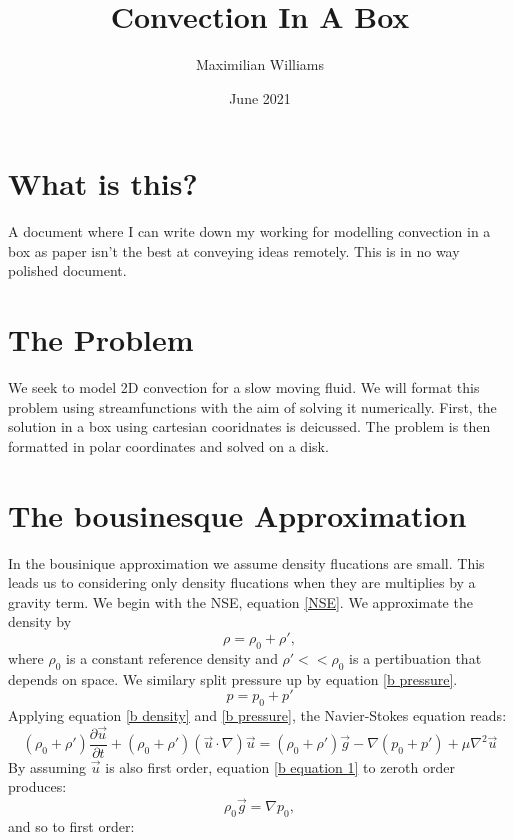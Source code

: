 \documentclass{article}
\title{Convection In A Box}
\author{Maximilian Williams}
\date{June 2021}
\begin{document}
\maketitle

\section*{What is this?}
A document where I can write down my working for modelling convection in a box as paper isn't the best at conveying ideas remotely. This is in no way polished document.

\section*{The Problem}
We seek to model 2D convection for a slow moving fluid. We will format this problem using streamfunctions with the aim of solving it numerically. First, the solution in a box using cartesian cooridnates is deicussed. The problem is then formatted in polar coordinates and solved on a disk.
\section*{The bousinesque Approximation}
In the bousinique approximation we assume density flucations are small. This leads us to considering only density flucations when they are multiplies by a gravity term.
\newline
We begin with the NSE, equation \ref{NSE}. We approximate the density by
\begin{equation}
	\rho = \rho_0 + \rho',
	\label{b density}
\end{equation}
where $\rho_0$ is a constant reference density and $\rho' << \rho_0$ is a pertibuation that depends on space. We similary split pressure up by equation \ref{b pressure}. 
\begin{equation}
	p = p_0 + p'
	\label{b pressure}
\end{equation}
Applying equation \ref{b density} and \ref{b pressure}, the Navier-Stokes equation reads:
\begin{equation}
	(\rho_0 + \rho') \frac{\partial \vec{u}}{\partial t} + (\rho_0 + \rho') (\vec{u} \cdot \nabla) \vec{u} = (\rho_0 + \rho') \vec{g} - \nabla (p_0 + p') + \mu \nabla^2 \vec{u}
	\label{b equation 1}
\end{equation}
By assuming $\vec{u}$ is also first order, equation \ref{b equation 1} to zeroth order produces:
\begin{equation}
	\rho_0 \vec{g} = \nabla p_0,
\end{equation}
and so to first order:
\end{document}

